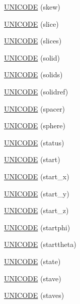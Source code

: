 \begin{DoxyCompactItemize}
\hyperlink{namespace_d_d4hep_1_1_x_m_l_aed0481c5dcc89b907fe4a4839ae6119c}{U\+N\+I\+C\+O\+DE} (skew)
\item 
\hyperlink{namespace_d_d4hep_1_1_x_m_l_a26275dae27ebc1e17a72ca0480bc5454}{U\+N\+I\+C\+O\+DE} (slice)
\item 
\hyperlink{namespace_d_d4hep_1_1_x_m_l_aeeedf7803729a82c7f281dd974fe0f02}{U\+N\+I\+C\+O\+DE} (slices)
\item 
\hyperlink{namespace_d_d4hep_1_1_x_m_l_aecb476f0abd293b4cca0971bee080f87}{U\+N\+I\+C\+O\+DE} (solid)
\item 
\hyperlink{namespace_d_d4hep_1_1_x_m_l_a9c65851ccd42927782350c218d8ec213}{U\+N\+I\+C\+O\+DE} (solids)
\item 
\hyperlink{namespace_d_d4hep_1_1_x_m_l_a0a1373a4600dfea2c5c6cc0ed52a64d5}{U\+N\+I\+C\+O\+DE} (solidref)
\item 
\hyperlink{namespace_d_d4hep_1_1_x_m_l_af243b19120675001464062077850f70e}{U\+N\+I\+C\+O\+DE} (spacer)
\item 
\hyperlink{namespace_d_d4hep_1_1_x_m_l_aae2c3b65d9a48eeb4fc6392a1cc3c2c3}{U\+N\+I\+C\+O\+DE} (sphere)
\item 
\hyperlink{namespace_d_d4hep_1_1_x_m_l_ac58042b51ed2308de2f119f437a1bb21}{U\+N\+I\+C\+O\+DE} (status)
\item 
\hyperlink{namespace_d_d4hep_1_1_x_m_l_ad2491bbf530cff79229435d693b4f080}{U\+N\+I\+C\+O\+DE} (start)
\item 
\hyperlink{namespace_d_d4hep_1_1_x_m_l_a4f8641b1ed5d0087f273490343694903}{U\+N\+I\+C\+O\+DE} (start\+\_\+x)
\item 
\hyperlink{namespace_d_d4hep_1_1_x_m_l_a7867555bd95f3d1f790dd70083c2c6aa}{U\+N\+I\+C\+O\+DE} (start\+\_\+y)
\item 
\hyperlink{namespace_d_d4hep_1_1_x_m_l_a3a7209b884fa528e3fc2d87d4eab7154}{U\+N\+I\+C\+O\+DE} (start\+\_\+z)
\item 
\hyperlink{namespace_d_d4hep_1_1_x_m_l_a25a3a43fcd0ddc0dfe49a188efb7ea33}{U\+N\+I\+C\+O\+DE} (startphi)
\item 
\hyperlink{namespace_d_d4hep_1_1_x_m_l_a09dfb6a2a7274824928194d0dd553ee5}{U\+N\+I\+C\+O\+DE} (starttheta)
\item 
\hyperlink{namespace_d_d4hep_1_1_x_m_l_a6017eafed0b49e22a5b5ef940452d648}{U\+N\+I\+C\+O\+DE} (state)
\item 
\hyperlink{namespace_d_d4hep_1_1_x_m_l_a607e9ca7ddb201b8bd6396f730f46da0}{U\+N\+I\+C\+O\+DE} (stave)
\item 
\hyperlink{namespace_d_d4hep_1_1_x_m_l_a9db672b598862b8117f1440a2ed76526}{U\+N\+I\+C\+O\+DE} (staves)

\end{DoxyCompactItemize}

